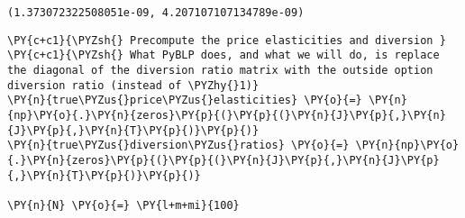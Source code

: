     \begin{Verbatim}[commandchars=\\\{\}]

    \end{Verbatim}

            \begin{tcolorbox}[breakable, size=fbox, boxrule=.5pt, pad at break*=1mm, opacityfill=0]
\begin{Verbatim}[commandchars=\\\{\}]
(1.373072322508051e-09, 4.207107107134789e-09)
\end{Verbatim}
\end{tcolorbox}

    \begin{tcolorbox}[breakable, size=fbox, boxrule=1pt, pad at break*=1mm,colback=cellbackground, colframe=cellborder]
\begin{Verbatim}[commandchars=\\\{\}]
\PY{c+c1}{\PYZsh{} Precompute the price elasticities and diversion }
\PY{c+c1}{\PYZsh{} What PyBLP does, and what we will do, is replace the diagonal of the diversion ratio matrix with the outside option diversion ratio (instead of \PYZhy{}1)}
\PY{n}{true\PYZus{}price\PYZus{}elasticities} \PY{o}{=} \PY{n}{np}\PY{o}{.}\PY{n}{zeros}\PY{p}{(}\PY{p}{(}\PY{n}{J}\PY{p}{,}\PY{n}{J}\PY{p}{,}\PY{n}{T}\PY{p}{)}\PY{p}{)}
\PY{n}{true\PYZus{}diversion\PYZus{}ratios} \PY{o}{=} \PY{n}{np}\PY{o}{.}\PY{n}{zeros}\PY{p}{(}\PY{p}{(}\PY{n}{J}\PY{p}{,}\PY{n}{J}\PY{p}{,}\PY{n}{T}\PY{p}{)}\PY{p}{)}

\PY{n}{N} \PY{o}{=} \PY{l+m+mi}{100}


\end{Verbatim}
\end{tcolorbox}
